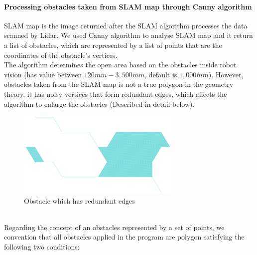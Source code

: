 \documentclass[13pt,a4paper]{article}
\begin{document}
	\paragraph{Processing obstacles taken from SLAM map through Canny algorithm\\}
	SLAM map is the image returned after the SLAM algorithm processes the data scanned by Lidar. We used Canny algorithm to analyse SLAM map and it return a list of obstacles, which are represented by a list of points that are the coordinates of the obstacle's vertices. \\
	The algorithm determines the open area based on the obstacles inside robot vision (has value between $120mm - 3,500mm$, default is $1,000mm$). However, obstacles taken from the SLAM map is not a true polygon in the geometry theory, it has noisy vertices that form redundant edges, which affects the algorithm to enlarge the obstacles (Described in detail below).
	\begin{figure}[!h]
		\centering
		\includegraphics[width=0.7\textwidth]{Robot_Global_Vision_Update/RGVU_original_obstacle.png}
		\caption{Obstacle which has redundant edges}
	\end{figure} \\
	Regarding the concept of an obstacles represented by a set of points, we convention that all obstacles applied in the program are polygon satisfying the following two conditions:
\end{document}
